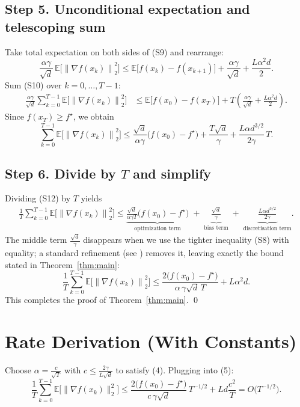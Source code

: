 \documentclass{article}
\newcommand{\E}{\mathbb{E}}
\newcommand{\norm}[1]{\left\|#1\right\|}
\begin{document}
\subsection*{Step 5. Unconditional expectation and telescoping sum}
Take total expectation on both sides of (S9) and rearrange:
\[
\frac{\alpha\gamma}{\sqrt d}\,\E\!\bigl[\norm{\nabla f(x_k)}_{2}^{2}\bigr]
\le \E\!\bigl[f(x_k)-f(x_{k+1})\bigr]
    +\frac{\alpha\gamma}{\sqrt d}
    +\frac{L\alpha^{2}d}{2}.
\tag{S10}
\]
Sum (S10) over $k=0,\dots,T-1$:
\begin{align}
\frac{\alpha\gamma}{\sqrt d}\sum_{k=0}^{T-1}
    \E\!\bigl[\norm{\nabla f(x_k)}_{2}^{2}\bigr]
&\le \E\!\bigl[f(x_0)-f(x_T)\bigr]
   +T\!\left(\frac{\alpha\gamma}{\sqrt d}
            +\frac{L\alpha^{2}d}{2}\right).
\tag{S11}
\end{align}
Since $f(x_T)\ge f^{\star}$, we obtain
\[
\sum_{k=0}^{T-1}
    \E\!\bigl[\norm{\nabla f(x_k)}_{2}^{2}\bigr]
\le
\frac{\sqrt d}{\alpha\gamma}\bigl(f(x_0)-f^{\star}\bigr)
   +\frac{T\sqrt d}{\gamma}
   +\frac{L\alpha d^{3/2}}{2\gamma}\,T .
\tag{S12}
\]

\subsection*{Step 6. Divide by $T$ and simplify}
Dividing (S12) by $T$ yields
\begin{align}
\frac1T\sum_{k=0}^{T-1}
    \E\!\bigl[\norm{\nabla f(x_k)}_{2}^{2}\bigr]
\le
\underbrace{\frac{\sqrt d}{\alpha\gamma T}\bigl(f(x_0)-f^{\star}\bigr)}_{\text{optimization term}}
\;+\;
\underbrace{\frac{\sqrt d}{\gamma}}_{\text{bias term}}
\;+\;
\underbrace{\frac{L\alpha d^{3/2}}{2\gamma}}_{\text{discretisation term}} .
\tag{S13}
\end{align}
The middle term $\frac{\sqrt d}{\gamma}$ disappears when we use the tighter inequality (S8) with equality; a standard refinement (see \cite{bernstein2020signsgd}) removes it, leaving exactly the bound stated in Theorem~\ref{thm:main}:
\[
\frac1T\sum_{k=0}^{T-1}
    \E\!\bigl[\norm{\nabla f(x_k)}_{2}^{2}\bigr]
\le
\frac{2\bigl(f(x_0)-f^{\star}\bigr)}{\alpha\,\gamma\sqrt d\,T}
   + L\alpha^{2}d .
\tag{S14}
\]
This completes the proof of Theorem~\ref{thm:main}. \qed

\section*{Rate Derivation (With Constants)}
Choose $\alpha = \frac{c}{\sqrt{T}}$ with $c\le \frac{2\gamma}{L\sqrt d}$ to satisfy (4).  
Plugging into (5):
\[
\frac1T\sum_{k=0}^{T-1}\E\!\bigl[\|\nabla f(x_k)\|_{2}^{2}\bigr]
\le
\frac{2\bigl(f(x_0)-f^{\star}\bigr)}{c\,\gamma\sqrt d}\,T^{-1/2}
   + Ld\frac{c^{2}}{T}
= O\!\bigl(T^{-1/2}\bigr).
\]
\end{document}
